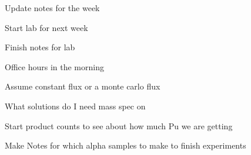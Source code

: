 \documentclass[idxtotoc,hyperref,openany,oneside]{labbook} %
\newcommand{\cmark}{\ding{51}}%
\newcommand{\done}{\rlap{$\square$}{\raisebox{2pt}{\large\hspace{1pt}\cmark}}%
  \hspace{-2.5pt}}
\begin{document}



\begin{todolist}
\item[\done]{Update notes for the week}
\end{todolist}



\begin{todolist}
\item[\done]{Start lab for next week}
\end{todolist}






\begin{todolist}
\item{Finish notes for lab}
\item{Office hours in the morning}
\end{todolist}


\begin{todolist}
\item{Assume constant flux or a monte carlo flux}
\item{What solutions do I need mass spec on}
\end{todolist}



\begin{todolist}
\item{Start product counts to see about how much Pu we are getting}
\item{Make Notes for which alpha samples to make to finish experiments}
\end{todolist}




\end{document}
